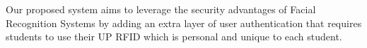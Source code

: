 Our proposed system aims to leverage the security advantages of Facial Recognition Systems by adding an extra layer of user authentication that requires students to use their UP RFID which is personal and unique to each student.

\begin{comment}

%
%
Guide on Writing your RRL chapter

1. Identify the keywords with respect to your research
      One keyword = One document section
                Examples: 2.1 Story Generation Systems
			 2.2 Knowledge Representation

2.  Find references using these keywords

3.  For each of the references that you find,
        Check: Is it relevant to your research?
        Use their references to find more relevant works.

4. Identify a set of criteria for comparison.
       It will serve as a guide to help you focus on what to look for

5. Write a summary focusing on -
       What: A short description of the work
       How: A summary of the approach it utilized
       Findings: If applicable, provide the results
        Why: Relevance to your work

6. At the end of each section,  show a Table of Comparison of the related works
   and your proposed project/system

<<<<<<< HEAD

=======
\section{Theme 1 Title}
This chapter  contains a review of research papers that:
%
%
\begin{itemize}
	\item Describes work on a research area that is similar or relevant to yours
	\item Describes work on a domain that is similar or relevant to yours
	\item Uses an algorithm that may be useful to your work
	\item Uses a software / tool that may be useful to your work
\end{itemize}

It also contains a review of software systems that:
%
%
\begin{itemize}
	\item Belongs to a research area similar to yours
	\item Addresses a need or domain similar to yours
	\item Is your predecessor
\end{itemize}


\end{comment}
